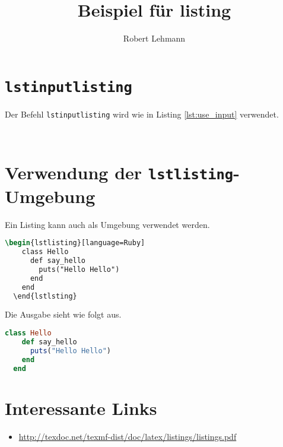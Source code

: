 \documentclass[12pt, a4paper]{scrartcl}
\title{Beispiel für listing}
\author{Robert Lehmann}
\begin{document}
\maketitle
\tableofcontents
\lstlistoflistings

\section{\texttt{lstinputlisting}}
Der Befehl \texttt{lstinputlisting} wird wie in Listing \ref{lst:use_input} 
verwendet.
\begin{lstlisting}[language=TeX, caption={Verwendung lstinputlisting}, label={lst:use_input}]
  
\end{lstlisting}


\section{Verwendung der \texttt{lstlisting}-Umgebung}
Ein Listing kann auch als Umgebung verwendet werden.
\begin{lstlisting}[language=TeX, caption={Verwendung lstlisting Enviroment}, label={lst:use_enviroment}]
  \begin{lstlisting}[language=Ruby]
    class Hello
      def say_hello
        puts("Hello Hello")
      end
    end
  \end{lstlsting}
\end{lstlisting}
Die Ausgabe sieht wie folgt aus.
\begin{lstlisting}[language=Ruby, caption={Beispiel lstlisting Enviroment}, label={lst:enviroment}]
  class Hello
    def say_hello
      puts("Hello Hello")
    end
  end
\end{lstlisting}

\section{Interessante Links}
\begin{itemize}
  \item \url{http://texdoc.net/texmf-dist/doc/latex/listings/listings.pdf}
\end{itemize}
\end{document}
